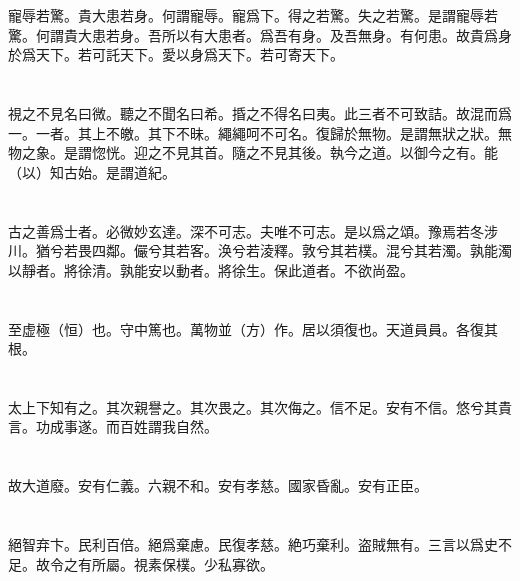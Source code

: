 \documentclass[a5paper]{ctexbook}
\begin{document}
    寵辱若驚。貴大患若身。何謂寵辱。寵爲下。得之若驚。失之若驚。是謂寵辱若驚。何謂貴大患若身。吾所以有大患者。爲吾有身。及吾無身。有何患。故貴爲身於爲天下。若可託天下。愛以身爲天下。若可寄天下。

    \chapter{}

    視之不見名曰微。聽之不聞名曰希。捪之不得名曰夷。此三者不可致詰。故混而爲一。一者。其上不皦。其下不昧。繩繩呵不可名。復歸於無物。是謂無狀之狀。無物之象。是謂惚恍。迎之不見其首。隨之不見其後。執今之道。以御今之有。能（以）知古始。是謂道紀。

    \chapter{}

    古之善爲士者。必微妙玄達。深不可志。夫唯不可志。是以爲之頌。豫焉若冬涉川。猶兮若畏四鄰。儼兮其若客。涣兮若淩釋。敦兮其若樸。混兮其若濁。孰能濁以靜者。將徐清。孰能安以動者。將徐生。保此道者。不欲尚盈。

    \chapter{}

    至虚極（恒）也。守中篤也。萬物並（方）作。居以須復也。天道員員。各復其根。

    \chapter{}

    太上下知有之。其次親譽之。其次畏之。其次侮之。信不足。安有不信。悠兮其貴言。功成事遂。而百姓謂我自然。

    \chapter{}

    故大道廢。安有仁義。六親不和。安有孝慈。國家昏亂。安有正臣。

    \chapter{}

    絕智弃卞。民利百倍。絕爲棄慮。民復孝慈。絶巧棄利。盗賊無有。三言以爲史不足。故令之有所屬。視素保樸。少私寡欲。

    \chapter{}
\end{document}
